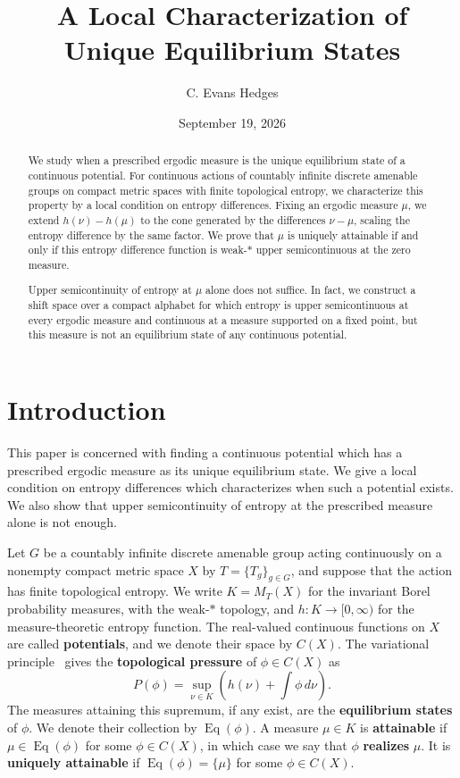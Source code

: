\documentclass[10pt]{amsart}
\title[Unique Equilibrium States]{A Local Characterization of Unique Equilibrium States}
\author{C. Evans Hedges}
\date{September 19, 2026}
\numberwithin{equation}{section}
\newcommand{\Eq}{\operatorname{Eq}}
\begin{document}
\begin{abstract}
We study when a prescribed ergodic measure is the unique equilibrium
state of a continuous potential. For continuous actions of countably
infinite discrete amenable groups on compact metric spaces with finite
topological entropy, we characterize this property by a local condition
on entropy differences. Fixing an ergodic measure $\mu$, we extend
$h(\nu)-h(\mu)$ to the cone generated by the differences
$\nu-\mu$, scaling the entropy difference by the same factor. We prove
that $\mu$ is uniquely attainable if and only if this entropy difference
function is weak\nobreakdash-$*$ upper semicontinuous at the zero measure.

Upper semicontinuity of entropy at $\mu$ alone does not suffice. In fact, we
construct a shift space over a compact alphabet for which entropy is
upper semicontinuous at every ergodic measure and continuous at a measure supported on a fixed point, but this measure
is not an equilibrium state of any continuous potential.
\end{abstract}

\maketitle

\section{Introduction}

This paper is concerned with finding a continuous potential which has
a prescribed ergodic measure as its unique equilibrium state. We give
a local condition on entropy differences which characterizes when
such a potential exists. We also show that upper semicontinuity of
entropy at the prescribed measure alone is not enough.

Let $G$ be a countably infinite discrete amenable group acting
continuously on a nonempty compact metric space $X$ by
$T=\{T_g\}_{g\in G}$, and suppose that the action has finite topological
entropy. We write $K=M_T(X)$ for the invariant Borel probability
measures, with the weak\nobreakdash-$*$ topology, and
$h:K\to[0,\infty)$ for the measure-theoretic entropy function.
The real-valued continuous functions on $X$ are called
\textbf{potentials}, and we denote their space by $C(X)$. The
variational principle~\cite{ollagnier-pinchon} gives the
\textbf{topological pressure} of $\phi\in C(X)$ as
\[
 P(\phi)=\sup_{\nu\in K}\left(h(\nu)+\int\phi\,d\nu\right).
\]
The measures attaining this supremum, if any exist, are the
\textbf{equilibrium states} of $\phi$. We denote their collection by
$\Eq(\phi)$. A measure
$\mu\in K$ is \textbf{attainable} if $\mu\in\Eq(\phi)$ for some
$\phi\in C(X)$, in which case we say that $\phi$ \textbf{realizes} $\mu$.
It is \textbf{uniquely attainable} if $\Eq(\phi)=\{\mu\}$ for some
$\phi\in C(X)$.
\end{document}
